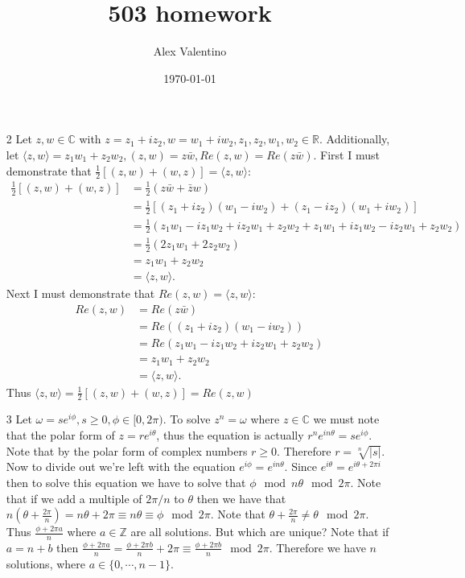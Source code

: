 \documentclass[12pt, letterpaper]{article}
\date{\today}
\author{Alex Valentino}
\title{503 homework}
\newcommand{\Z}{\mathbb{Z}}
\newcommand{\R}{\mathbb{R}}
\newcommand{\C}{\mathbb{C}}
\begin{document}
\begin{enumerate}
	\item[2] Let $z,w \in \C$ with $z = z_1 + i z_2, w = w_1 + i w_2, z_1, z_2, w_1, w_2 \in \R$.  Additionally, let 
	$\langle z,w \rangle = z_1 w_1 + z_2 w_2, (z,w) = z \bar{w}, Re(z,w) = Re(z \bar{w} ) $.  First I must demonstrate that 
	$\frac{1}{2}[(z,w) + (w,z)] =  \langle z,w \rangle$:
	\begin{align*}
		\frac{1}{2}[(z,w) + (w,z)] &= \frac{1}{2} (z \bar{w} + \bar{z} w)\\
		&= \frac{1}{2} [(z_1 + i z_2)(w_1 - i w_2) + (z_1 - i z_2)(w_1 + i w_2)]\\
		&= \frac{1}{2} (z_1 w_1 - i z_1 w_2 + i z_2 w_1 + z_2 w_2 + z_1 w_1 + i z_1 w_2 - i z_2 w_1 + z_2 w_2)\\
		&= \frac{1}{2} (2 z_1 w_1 + 2 z_2 w_2)\\
		&= z_1 w_1 + z_2 w_2\\
		&= \langle z,w \rangle.
	\end{align*}
	Next I must demonstrate that $Re(z,w) =\langle z,w \rangle $:
	\begin{align*}
		Re(z,w) &= Re(z\bar{w})\\
		&= Re((z_1 + iz_2)(w_1 - i w_2))\\
		&= Re(z_1 w_1 - i z_1 w_2 + i z_2 w_1 + z_2 w_2)\\
		&= z_1 w_1 + z_2 w_2\\
		&= \langle z,w \rangle.
	\end{align*}
	Thus $\langle z,w \rangle = \frac{1}{2}[(z,w) + (w,z)] = Re(z,w)$
	\item[3] Let $\omega = s e^{i \phi}, s \geq 0, \phi \in [0,2\pi)$.  To solve $z^n = \omega$ where $z \in \C$ we must note that the polar form of $z = re^{i \theta}$, thus the 
	equation is actually $r^n e^{i n\theta} = s e^{i \phi}$.  Note that by the polar form
	of complex numbers $r\geq 0$.  Therefore $r = \sqrt[n]{|s|}$.  Now to divide out we're 
	left with the equation $e^{i \phi} = e^{i n \theta}$.  Since $e^{i \theta} = 
	e^{i \theta + 2 \pi i}$ then to solve this equation we have to solve that 
	$\phi \mod n \theta \mod{2 \pi}$.  Note that if we add a multiple of $2\pi /n$ to 
	$\theta$ then we have that $n (\theta + \frac{2 \pi }{n}) = n \theta + 2 \pi \equiv n\theta \equiv \phi \mod{2 \pi}$.  Note that $\theta + \frac{2 \pi }{n} \neq \theta \mod 2 \pi$.  Thus $\frac{\phi + 2 \pi a}{n}$ where $a \in \Z$ are all solutions.  But which are unique?  Note that if $a = n + b$ then $\frac{\phi + 2 \pi a}{n} = \frac{\phi + 2 \pi b}{n} + 2 \pi \equiv \frac{\phi + 2 \pi b}{n} \mod{2 \pi}$.  Therefore we have $n$ solutions, where $a \in \{0,\cdots, n-1\}$.

\end{enumerate}
\end{document}
